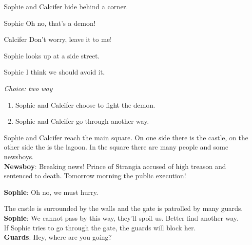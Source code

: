 \begin{screenplay}

Sophie and Calcifer hide behind a corner. 

\begin{dialogue}[worried]{Sophie}
Oh no, that’s a demon!
\end{dialogue}
\begin{dialogue}[feisty]{Calcifer}
Don’t worry, leave it to me!
\end{dialogue}

Sophie looks up at a side street.

\begin{dialogue}{Sophie}
I think we should avoid it.
\end{dialogue}
\end{screenplay}

\textit{Choice: two way}
\begin{enumerate}
  \item Sophie and Calcifer choose to fight the demon.
  \item Sophie and Calcifer go through another way.
\end{enumerate}
  
\noindent Sophie and Calcifer reach the main square. On one side there is the castle, on the other side the is the lagoon.
In the square there are many people and some newsboys.\\

\textbf{Newsboy}: Breaking news! Prince of Strangia accused of high treason and sentenced to death. Tomorrow morning the public execution!

\textbf{Sophie}: Oh no, we must hurry.

The castle is surrounded by the walls and the gate is patrolled by many guards.\\

\textbf{Sophie}: We cannot pass by this way, they’ll spoil us. Better find another way.\\

\noindent If Sophie tries to go through the gate, the guards will block her.\\

\textbf{Guards}: Hey, where are you going?\\


